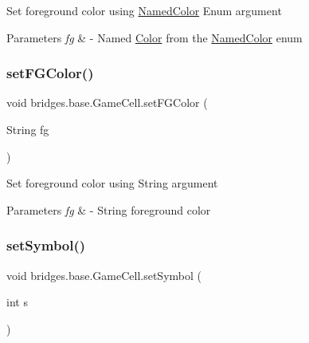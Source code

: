 Set foreground color using \hyperlink{enumbridges_1_1base_1_1_named_color}{Named\+Color} Enum argument 
\begin{DoxyParams}{Parameters}
{\em fg} & -\/ Named \hyperlink{classbridges_1_1base_1_1_color}{Color} from the \hyperlink{enumbridges_1_1base_1_1_named_color}{Named\+Color} enum \\
\hline
\end{DoxyParams}
\mbox{\label{classbridges_1_1base_1_1_game_cell_a3ffaf3300d8196a92d46e7c88ae32a86}} 
\subsubsection{\texorpdfstring{set\+F\+G\+Color()}{setFGColor()}\hspace{0.1cm}{\footnotesize\ttfamily [2/2]}}
{\footnotesize\ttfamily void bridges.\+base.\+Game\+Cell.\+set\+F\+G\+Color (\begin{DoxyParamCaption}\item[{String}]{fg }\end{DoxyParamCaption})}

Set foreground color using String argument 
\begin{DoxyParams}{Parameters}
{\em fg} & -\/ String foreground color \\
\hline
\end{DoxyParams}
\mbox{\label{classbridges_1_1base_1_1_game_cell_a5e6b4ed374ed3ec4bd6e72723e94848e}} 
\subsubsection{\texorpdfstring{set\+Symbol()}{setSymbol()}\hspace{0.1cm}{\footnotesize\ttfamily [1/2]}}
{\footnotesize\ttfamily void bridges.\+base.\+Game\+Cell.\+set\+Symbol (\begin{DoxyParamCaption}\item[{int}]{s }\end{DoxyParamCaption})}

